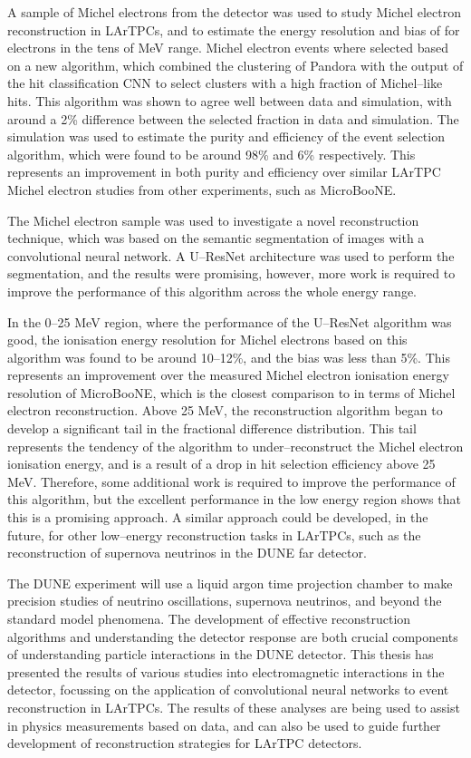 A sample of Michel electrons from the \protodune{} detector was used to study
Michel electron reconstruction in LArTPCs, and to estimate the energy resolution
and bias of \protodune{} for electrons in the tens of MeV range. Michel electron
events where selected based on a new algorithm, which combined the clustering of
Pandora with the output of the hit classification CNN to select clusters with a
high fraction of Michel--like hits. This algorithm was shown to agree well
between data and simulation, with around a 2\% difference between the selected
fraction in data and simulation. The simulation was used to estimate the purity
and efficiency of the event selection algorithm, which were found to be around
98\% and 6\% respectively. This represents an improvement in both purity and
efficiency over similar LArTPC Michel electron studies from other experiments,
such as MicroBooNE.

The Michel electron sample was used to investigate a novel reconstruction
technique, which was based on the semantic segmentation of images with a
convolutional neural network. A U--ResNet architecture was used to perform the
segmentation, and the results were promising, however, more work is required to
improve the performance of this algorithm across the whole energy range. 

In the 0--25 MeV region, where the performance of the U--ResNet algorithm was 
good, the ionisation energy resolution for Michel electrons based on this 
algorithm was found to be around 10--12\%, and the bias was less than 
5\%. This represents an improvement over the measured Michel electron ionisation
energy resolution of MicroBooNE, which is the closest comparison to \protodune{}
in terms of Michel electron reconstruction. Above 25 MeV, the reconstruction 
algorithm began to develop a significant tail in the fractional difference 
distribution. This tail represents the tendency of the algorithm to 
under--reconstruct the Michel electron ionisation energy, and is a result of a 
drop in hit selection efficiency above 25 MeV. Therefore, some additional work
is required to improve the performance of this algorithm, but the excellent
performance in the low energy region shows that this is a promising approach. A
similar approach could be developed, in the future, for other low--energy 
reconstruction tasks in LArTPCs, such as the reconstruction of supernova 
neutrinos in the DUNE far detector.

The DUNE experiment will use a liquid argon time projection chamber to make 
precision studies of neutrino oscillations, supernova neutrinos, and beyond 
the standard model phenomena. The development of effective reconstruction 
algorithms and understanding the detector response are both crucial components 
of understanding particle interactions in the DUNE detector. This thesis has 
presented the results of various studies into electromagnetic interactions in 
the \protodune{} detector, focussing on the application of convolutional 
neural networks to event reconstruction in LArTPCs. The results of these 
analyses are being used to assist in physics measurements based on 
\protodune{} data, and can also be used to guide further development of 
reconstruction strategies for LArTPC detectors.
